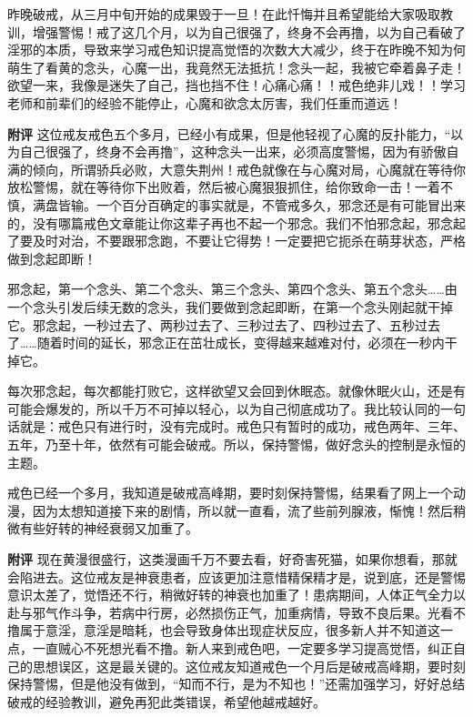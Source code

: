 \begin{case}
    昨晚破戒，从三月中旬开始的成果毁于一旦！在此忏悔并且希望能给大家吸取教训，增强警惕！戒了这几个月，以为自己很强了，终身不会再撸，以为自己看破了淫邪的本质，导致来学习戒色知识提高觉悟的次数大大减少，终于在昨晚不知为何萌生了看黄的念头，心魔一出，我竟然无法抵抗！念头一起，我被它牵着鼻子走！欲望一来，我像是迷失了自己，挡也挡不住！心痛心痛！！戒色绝非儿戏！！学习老师和前辈们的经验不能停止，心魔和欲念太厉害，我们任重而道远！

    \textbf{附评} 这位戒友戒色五个多月，已经小有成果，但是他轻视了心魔的反扑能力，“以为自己很强了，终身不会再撸”，这种念头一出来，必须高度警惕，因为有骄傲自满的倾向，所谓骄兵必败，大意失荆州！戒色就像在与心魔对局，心魔就在等待你放松警惕，就在等待你下出败着，然后被心魔狠狠抓住，给你致命一击！一着不慎，满盘皆输。一个百分百确定的事实就是，不管戒多久，邪念还是有可能冒出来的，没有哪篇戒色文章能让你这辈子再也不起一个邪念。我们不怕邪念起，邪念起了要及时对治，不要跟邪念跑，不要让它得势！一定要把它扼杀在萌芽状态，严格做到念起即断！

    邪念起，第一个念头、第二个念头、第三个念头、第四个念头、第五个念头……由一个念头引发后续无数的念头，我们要做到念起即断，在第一个念头刚起就干掉它。邪念起，一秒过去了、两秒过去了、三秒过去了、四秒过去了、五秒过去了……随着时间的延长，邪念正在茁壮成长，变得越来越难对付，必须在一秒内干掉它。

    每次邪念起，每次都能打败它，这样欲望又会回到休眠态。就像休眠火山，还是有可能会爆发的，所以千万不可掉以轻心，以为自己彻底成功了。我比较认同的一句话就是：戒色只有进行时，没有完成时。戒色只有暂时的成功，戒色两年、三年、五年，乃至十年，依然有可能会破戒。所以，保持警惕，做好念头的控制是永恒的主题。
\end{case}

\begin{case}
    戒色已经一个多月，我知道是破戒高峰期，要时刻保持警惕，结果看了网上一个动漫，因为太想知道接下来的剧情，所以就一直看，流了些前列腺液，惭愧！然后稍微有些好转的神经衰弱又加重了。

    \textbf{附评} 现在黄漫很盛行，这类漫画千万不要去看，好奇害死猫，如果你想看，那就会陷进去。这位戒友是神衰患者，应该更加注意惜精保精才是，说到底，还是警惕意识太差了，觉悟还不行，稍微好转的神衰也加重了！患病期间，人体正气全力以赴与邪气作斗争，若病中行房，必然损伤正气，加重病情，导致不良后果。光看不撸属于意淫，意淫是暗耗，也会导致身体出现症状反应，很多新人并不知道这一点，一直贼心不死想光看不撸。新人来到戒色吧，一定要多学习提高觉悟，纠正自己的思想误区，这是最关键的。这位戒友知道戒色一个月后是破戒高峰期，要时刻保持警惕，但是他没有做到，“知而不行，是为不知也！”还需加强学习，好好总结破戒的经验教训，避免再犯此类错误，希望他越戒越好。
\end{case}

